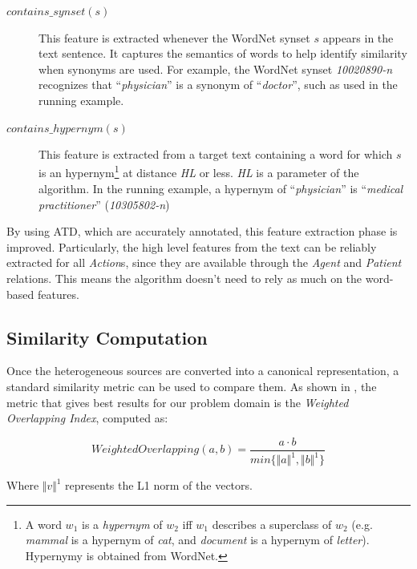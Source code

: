 \begin{description}
       \item[$contains\_synset(s)$]{This feature is extracted whenever the
           WordNet synset $s$ appears in the text sentence. It captures the
           semantics of words to help identify similarity when synonyms are
           used. For example, the WordNet synset \textit{10020890-n} recognizes
           that ``\textit{physician}'' is a synonym of ``\textit{doctor}'',
           such as used in the running example.}

       \item[$contains\_hypernym(s)$]{This feature is extracted from a target
           text containing a word for which $s$ is an hypernym\footnote{A word
             $w_1$ is a \textit{hypernym} of $w_2$ iff $w_1$ describes a
             superclass of $w_2$ (e.g. \textit{mammal} is a hypernym of
             \textit{cat}, and \textit{document} is a hypernym of
             \textit{letter}). Hypernymy is obtained from WordNet.} at distance
           \emph{HL} or less. \emph{HL} is a parameter of the algorithm. In the
           running example, a hypernym of ``\textit{physician}'' is
           ``\textit{medical practitioner}'' (\textit{10305802-n})}
\end{description}

By using ATD, which are accurately annotated, this feature extraction phase is
improved. Particularly, the high level features from the text can be reliably
extracted for all \emph{Action}s, since they are available through the
\emph{Agent} and \emph{Patient} relations. This means the algorithm doesn't need
to rely as much on the word-based features.

\subsection{Similarity Computation}

Once the heterogeneous sources are converted into a canonical representation, a
standard similarity metric can be used to compare them. As shown in
\cite{10.1007/978-3-319-59536-8_26}, the metric that gives best results for our
problem domain is the \emph{Weighted Overlapping Index}, computed as:

\begin{equation}
  WeightedOverlapping(a, b) = \frac{a \cdot b}{min\{\Vert a \Vert^1, \Vert b \Vert^1\}}
\end{equation}

Where $\Vert v \Vert^1$ represents the L1 norm of the vectors.

